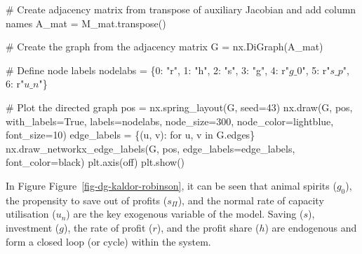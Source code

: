 \documentclass[
  letterpaper,
  DIV=11,
  numbers=noendperiod]{scrreprt}
\newenvironment{Shaded}{\begin{snugshade}}{\end{snugshade}}
\newcommand{\CommentTok}[1]{\textcolor[rgb]{0.37,0.37,0.37}{#1}}
\newcommand{\ControlFlowTok}[1]{\textcolor[rgb]{0.00,0.23,0.31}{#1}}
\newcommand{\DecValTok}[1]{\textcolor[rgb]{0.68,0.00,0.00}{#1}}
\newcommand{\KeywordTok}[1]{\textcolor[rgb]{0.00,0.23,0.31}{#1}}
\newcommand{\NormalTok}[1]{\textcolor[rgb]{0.00,0.23,0.31}{#1}}
\newcommand{\OperatorTok}[1]{\textcolor[rgb]{0.37,0.37,0.37}{#1}}
\newcommand{\StringTok}[1]{\textcolor[rgb]{0.13,0.47,0.30}{#1}}
\newcommand{\VariableTok}[1]{\textcolor[rgb]{0.07,0.07,0.07}{#1}}
\newcommand{\VerbatimStringTok}[1]{\textcolor[rgb]{0.13,0.47,0.30}{#1}}
\begin{document}
\begin{tcolorbox}
\begin{Shaded}
\begin{Highlighting}[]
\CommentTok{\# Create adjacency matrix from transpose of auxiliary Jacobian and add column names}
\NormalTok{A\_mat }\OperatorTok{=}\NormalTok{ M\_mat.transpose()}

\CommentTok{\# Create the graph from the adjacency matrix}
\NormalTok{G }\OperatorTok{=}\NormalTok{ nx.DiGraph(A\_mat)}

\CommentTok{\# Define node labels}
\NormalTok{nodelabs }\OperatorTok{=}\NormalTok{ \{}\DecValTok{0}\NormalTok{: }\StringTok{"r"}\NormalTok{, }\DecValTok{1}\NormalTok{: }\StringTok{"h"}\NormalTok{, }\DecValTok{2}\NormalTok{: }\StringTok{"s"}\NormalTok{, }\DecValTok{3}\NormalTok{: }\StringTok{"g"}\NormalTok{, }\DecValTok{4}\NormalTok{: }\VerbatimStringTok{r"$g\_0$"}\NormalTok{, }\DecValTok{5}\NormalTok{: }\VerbatimStringTok{r"$s\_p$"}\NormalTok{, }\DecValTok{6}\NormalTok{: }\VerbatimStringTok{r"$u\_n$"}\NormalTok{\}}

\CommentTok{\# Plot the directed graph}
\NormalTok{pos }\OperatorTok{=}\NormalTok{ nx.spring\_layout(G, seed}\OperatorTok{=}\DecValTok{43}\NormalTok{)  }
\NormalTok{nx.draw(G, pos, with\_labels}\OperatorTok{=}\VariableTok{True}\NormalTok{, labels}\OperatorTok{=}\NormalTok{nodelabs, node\_size}\OperatorTok{=}\DecValTok{300}\NormalTok{, node\_color}\OperatorTok{=}\StringTok{\textquotesingle{}lightblue\textquotesingle{}}\NormalTok{, }
\NormalTok{        font\_size}\OperatorTok{=}\DecValTok{10}\NormalTok{)}
\NormalTok{edge\_labels }\OperatorTok{=}\NormalTok{ \{(u, v): }\StringTok{\textquotesingle{}\textquotesingle{}} \ControlFlowTok{for}\NormalTok{ u, v }\KeywordTok{in}\NormalTok{ G.edges\}}
\NormalTok{nx.draw\_networkx\_edge\_labels(G, pos, edge\_labels}\OperatorTok{=}\NormalTok{edge\_labels, font\_color}\OperatorTok{=}\StringTok{\textquotesingle{}black\textquotesingle{}}\NormalTok{)}
\NormalTok{plt.axis(}\StringTok{\textquotesingle{}off\textquotesingle{}}\NormalTok{)}
\NormalTok{plt.show()}
\end{Highlighting}
\end{Shaded}

\end{tcolorbox}

In Figure Figure~\ref{fig-dg-kaldor-robinson}, it can be seen that
animal spirits (\(g_0\)), the propensity to save out of profits
(\(s_\Pi\)), and the normal rate of capacity utilisation (\(u_n\)) are
the key exogenous variable of the model. Saving (\(s\)), investment
(\(g\)), the rate of profit (\(r\)), and the profit share (\(h\)) are
endogenous and form a closed loop (or cycle) within the system.
\end{document}
